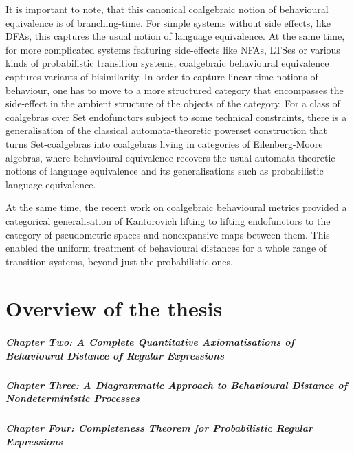 It is important to note, that this canonical coalgebraic notion of behavioural equivalence is of branching-time. For simple systems without side effects, like DFAs, this captures the usual notion of language equivalence. At the same time, for more complicated systems featuring side-effects like NFAs, LTSes or various kinds of probabilistic transition systems, coalgebraic behavioural equivalence captures variants of bisimilarity. In order to capture linear-time notions of behaviour, one has to move to a more structured category that encompasses the side-effect in the ambient structure of the objects of the category. For a class of coalgebras over Set endofunctors subject to some technical constraints, there is a generalisation of the classical automata-theoretic powerset construction that turns Set-coalgebras into coalgebras living in categories of Eilenberg-Moore algebras, where behavioural equivalence recovers the usual automata-theoretic notions of language equivalence and its generalisations such as probabilistic language equivalence. 

At the same time, the recent work on coalgebraic behavioural metrics provided a categorical generalisation of Kantorovich lifting to lifting endofunctors to the category of pseudometric spaces and nonexpansive maps between them. This enabled the uniform treatment of behavioural distances for a whole range of transition systems, beyond just the probabilistic ones. 
\section{Overview of the thesis}
\subparagraph{Chapter Two: A Complete Quantitative Axiomatisations of Behavioural Distance of Regular Expressions}
\subparagraph{Chapter Three: A Diagrammatic Approach to Behavioural Distance of Nondeterministic Processes}
\subparagraph{Chapter Four: Completeness Theorem for Probabilistic Regular Expressions}





